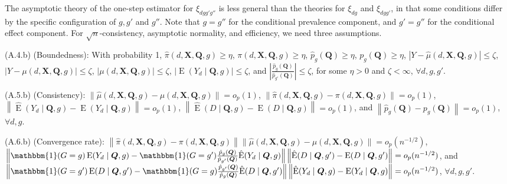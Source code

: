 \documentclass[12pt,a4paper]{article}
\newcommand{\E}{\operatorname{E}}
\def\X{{\boldsymbol X}}
\def\Q{{\boldsymbol Q}}
\def\one{\mathbbm{1}}
\begin{document}
The asymptotic theory of the one-step estimator for $\xi_{dgg'g''}$ is less general than the theories for $\xi_{dg}$ and $\xi_{dgg'}$, in that some conditions differ by the specific configuration of $g, g'$ and $g''$. Note that  $g=g''$ for the conditional prevalence component, and $g'=g''$ for the conditional effect component. For $\sqrt{n}$-consistency, asymptotic normality, and efficiency, we need three assumptions. 

(A.4.b) (Boundedness): With probability 1,  $\hat{\pi}(d,\X,\Q,g) \geq \eta$, $\pi(d,\X,\Q,g) \geq \eta$, $\hat{p}_g(\Q) \geq \eta$, $p_g(\Q) \geq \eta$, 
$|Y-\hat{\mu}(d,\X,\Q,g)| \leq \zeta$, 
$|Y-\mu(d,\X,\Q,g)| \leq \zeta$, 
$|\mu(d,\X,\Q,g)| \leq \zeta$,
$|\E(Y_d \mid \Q,g)| \leq \zeta$, and $\left| \frac{\hat{p}_g(\Q)}{\hat{p}_{g'}(\Q)} \right| \leq \zeta$, for some $\eta>0$ and $\zeta < \infty$, $\forall d,g,g'$.

(A.5.b) (Consistency): $\| \hat{\mu}(d,\X,\Q,g) - \mu(d,\X,\Q,g) \| =o_p(1)$, $\| \hat{\pi}(d,\X,\Q,g) - \pi(d,\X,\Q,g) \| =o_p(1)$, $\left\| \hat{\E}(Y_d \mid \Q,g) - \E(Y_d \mid \Q,g) \right\| =o_p(1)$, $\left\| \hat{\E}(D \mid \Q,g) - \E(D \mid \Q,g) \right\| =o_p(1)$, and $\left\| \hat{p}_g(\Q) -p_g(\Q) \right\|=o_p(1)$, $\forall d,g$.

(A.6.b) (Convergence rate): $\left\|\hat{\pi}(d,\X,\Q,g)-\pi(d,\X,\Q,g) \right\| \|\hat{\mu}(d,\X,\Q,g)-\mu(d,\X,\Q,g)\|=o_p(n^{-1/2})$, $\left\| \one(G=g) \E(Y_d \mid \Q,g) - \one(G=g')\frac{\hat{p}_{g}(\Q)}{\hat{p}_{g'}(\Q)} \hat{\E}( Y_d \mid \Q, g ) \right\| \left\| \hat{\E}(D \mid \Q, g') - \E(D \mid \Q, g') \right\| = o_p(n^{-1/2})$, and $\left\| \one(G=g') \E(D \mid \Q,g') - \one(G=g) \frac{\hat{p}_{g'}(\Q) }{\hat{p}_g(\Q) } \hat{\E}(D \mid \Q,g') \right\| \left\| \hat{\E}(Y_d \mid \Q,g) - \E(Y_d \mid \Q,g)  \right\| = o_p(n^{-1/2})$, $\forall d,g,g'$.
\end{document}
